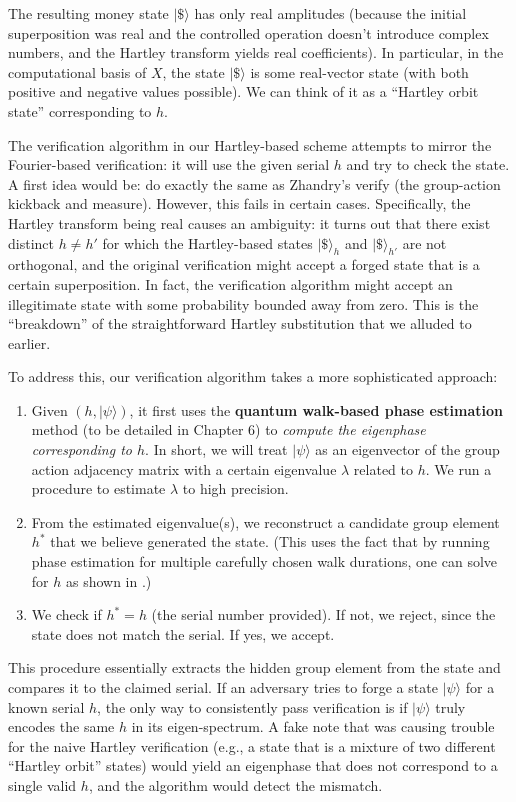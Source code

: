 \documentclass[12pt]{report}
\begin{document}
The resulting money state $|\$\rangle$ has only real amplitudes (because the initial superposition was real and the controlled operation doesn’t introduce complex numbers, and the Hartley transform yields real coefficients). In particular, in the computational basis of $X$, the state $|\$\rangle$ is some real-vector state (with both positive and negative values possible). We can think of it as a “Hartley orbit state” corresponding to $h$.

The verification algorithm in our Hartley-based scheme attempts to mirror the Fourier-based verification: it will use the given serial $h$ and try to check the state. A first idea would be: do exactly the same as Zhandry’s verify (the group-action kickback and measure). However, this fails in certain cases. Specifically, the Hartley transform being real causes an ambiguity: it turns out that there exist distinct $h \neq h'$ for which the Hartley-based states $|\$\rangle_h$ and $|\$\rangle_{h'}$ are not orthogonal, and the original verification might accept a forged state that is a certain superposition. In fact, the verification algorithm might accept an illegitimate state with some probability bounded away from zero. This is the “breakdown” of the straightforward Hartley substitution that we alluded to earlier.

To address this, our verification algorithm takes a more sophisticated approach:
\begin{enumerate}
    \item Given $(h, |\psi\rangle)$, it first uses the \textbf{quantum walk-based phase estimation} method (to be detailed in Chapter 6) to \emph{compute the eigenphase corresponding to $h$}. In short, we will treat $|\psi\rangle$ as an eigenvector of the group action adjacency matrix with a certain eigenvalue $\lambda$ related to $h$. We run a procedure to estimate $\lambda$ to high precision.
    \item From the estimated eigenvalue(s), we reconstruct a candidate group element $h^*$ that we believe generated the state. (This uses the fact that by running phase estimation for multiple carefully chosen walk durations, one can solve for $h$ as shown in \cite{Zhandry2022}.)
    \item We check if $h^* = h$ (the serial number provided). If not, we reject, since the state does not match the serial. If yes, we accept.
\end{enumerate}

This procedure essentially extracts the hidden group element from the state and compares it to the claimed serial. If an adversary tries to forge a state $|\psi\rangle$ for a known serial $h$, the only way to consistently pass verification is if $|\psi\rangle$ truly encodes the same $h$ in its eigen-spectrum. A fake note that was causing trouble for the naive Hartley verification (e.g., a state that is a mixture of two different “Hartley orbit” states) would yield an eigenphase that does not correspond to a single valid $h$, and the algorithm would detect the mismatch.
\end{document}
